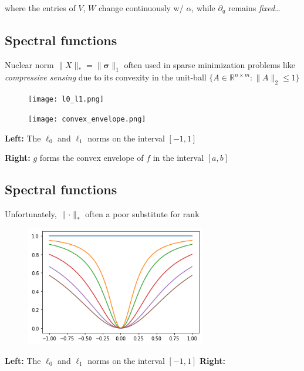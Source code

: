 \documentclass[
  letterpaper,
  DIV=11,
  numbers=noendperiod,
  oneside]{scrartcl}
\begin{document}
where the entries of \(V\), \(W\) change continuously w/ \(\alpha\),
while \(\partial_q\) remains \emph{fixed}\ldots{}

\hypertarget{spectral-functions-1}{%
\subsection{Spectral functions}\label{spectral-functions-1}}

Nuclear norm \(\lVert X \rVert_\ast = \lVert \mathbf{\sigma} \rVert_1\)
often used in sparse minimization problems like \emph{compressive
sensing} due to its convexity in the unit-ball
\(\{A \in \mathbb{R}^{n \times m} : \lVert A \rVert_2 \leq 1 \}\)

\begin{figure}

\begin{minipage}[b]{0.50\linewidth}

{\centering 

\texttt{[image: l0\_l1.png]}

}

\end{minipage}%
%
\begin{minipage}[b]{0.50\linewidth}

{\centering 

\texttt{[image: convex\_envelope.png]}

}

\end{minipage}%

\end{figure}

\textbf{Left:} The \(\ell_0\) and \(\ell_1\) norms on the interval
\([-1,1]\)

\textbf{Right:} \(g\) forms the convex envelope of \(f\) in the interval
\([a,b]\)

\hypertarget{spectral-functions-2}{%
\subsection{Spectral functions}\label{spectral-functions-2}}

Unfortunately, \(\lVert \cdot \rVert_\ast\) often a poor substitute for
rank

\begin{figure}

{\centering \includegraphics[width=0.7\textwidth,height=1\textheight]{rank_relax.png}

}

\end{figure}

\textbf{Left:} The \(\ell_0\) and \(\ell_1\) norms on the interval
\([-1,1]\) \textbf{Right:}
\end{document}
